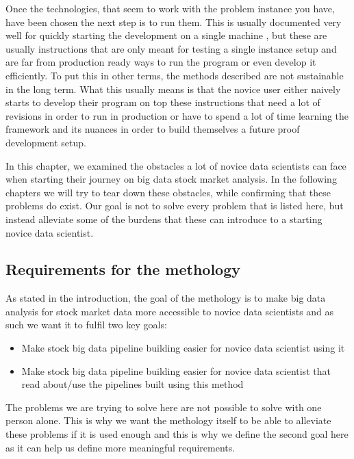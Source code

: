 Once the technologies, that seem to work with the problem instance you have, have been chosen the next step is to run them.
This is usually documented very well for quickly starting the development on a single machine \cite{kafka} \cite{flume}, but these are usually instructions that are only meant for testing a single instance setup and are far from production ready ways to run the program or even develop it efficiently.
To put this in other terms, the methods described are not sustainable in the long term.
What this usually means is that the novice user either naively starts to develop their program on top these instructions that need a lot of revisions in order to run in production or have to spend a lot of time learning the framework and its nuances in order to build themselves a future proof development setup.

In this chapter, we examined the obstacles a lot of novice data scientists can face when starting their journey on big data stock market analysis.
In the following chapters we will try to tear down these obstacles, while confirming that these problems do exist.
Our goal is not to solve every problem that is listed here, but instead alleviate some of the burdens that these can introduce to a starting novice data scientist.

\subsection{Requirements for the methology}

As stated in the introduction, the goal of the methology is to make big data analysis for stock market data more accessible to novice data scientists and as such we want it to fulfil two key goals:

\begin{itemize}
  \item Make stock big data pipeline building easier for novice data scientist using it
  \item Make stock big data pipeline building easier for novice data scientist that read about/use the pipelines built using this method
\end{itemize}

The problems we are trying to solve here are not possible to solve with one person alone.
This is why we want the methology itself to be able to alleviate these problems if it is used enough and this is why we define the second goal here as it can help us define more meaningful requirements.

